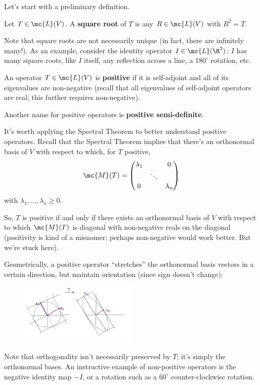 \documentclass[math0540-lecture-notes.tex]{subfiles}
\begin{document}
Let's start with a preliminary definition.
\begin{definition}{}
  Let $T\in \mc{L}(V)$. A \textbf{square root} of $T$ is any $R\in \mc{L}(V)$ with $R^2=T$.
\end{definition}
Note that square roots are not necessarily unique (in fact, there are infinitely many!). As an
example, consider the identity operator $I\in \mc{L}(\R^2)$; $I$ has many square roots, like $I$
itself, any reflection across a line, a $180^{\circ}$ rotation, etc.

\begin{definition}{}
  An operator $T\in \mc{L}(V)$ is \textbf{positive} if it is self-adjoint and all of
  its eigenvalues are non-negative (recall that all eigenvalues of self-adjoint operators are real;
  this further requires non-negative).

  Another name for positive operators is \textbf{positive semi-definite}.
\end{definition}

It's worth applying the Spectral Theorem to better understand positive operators. Recall that the
Spectral Theorem implies that there's an orthonormal basis of $V$ with respect to which, for $T$
positive, \[
  \mc{M}(T)=\begin{pmatrix} \lambda_1&&0\\&\ddots&\\0&&\lambda_n \end{pmatrix} 
\] with $\lambda_1,\ldots,\lambda_n\ge 0$.

\begin{mdframed}
  So, $T$ is positive if and only if there exists an orthonormal basis of $V$ with respect to which
  $\mc{M}(T)$ is diagonal with non-negative reals on the diagonal (positivity is kind of a misnomer;
  perhaps non-negative would work better. But we're stuck here).
\end{mdframed}

Geometrically, a positive operator ``stretches'' the orthonormal basis vectors in a certain
direction, but maintain orientation (since sign doesn't change):
\begin{figure}[htpb]
  \centering
  \includegraphics[width=0.5\textwidth]{last_lec.png}
\end{figure}
Note that orthogonality isn't necessarily preserved by $T$; it's simply the orthonormal bases. An
instructive example of non-positive operators is the negative identity map $-I$, or a rotation such
as a $60^{\circ}$ counter-clockwise rotation.
\end{document}
